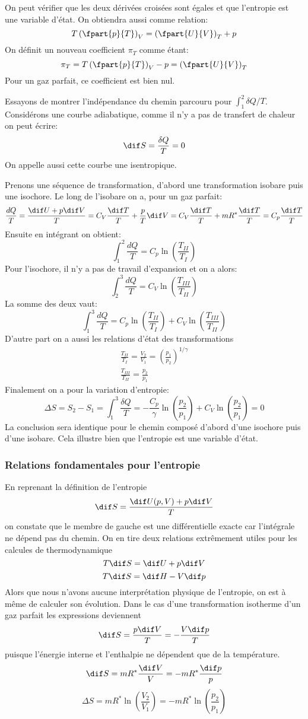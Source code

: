 On peut vérifier que les deux dérivées croisées sont égales et
que l'entropie est une variable d'état.
On obtiendra aussi comme relation:
\[ T\left(\fpart{p}{T}\right)_V =
\left(\fpart{U}{V}\right)_T+p \]
On définit un nouveau coefficient $\pi_T$ comme étant:
\[ \pi_T = T\left(\fpart{p}{T}\right)_V -p =
\left(\fpart{U}{V}\right)_T \]
Pour un gaz parfait, ce coefficient est bien nul.

Essayons de montrer l'indépendance du chemin parcouru
pour $\int_1^2 \delta Q/T$.
Considérons une courbe adiabatique,
comme il n'y a pas de transfert de chaleur on peut écrire:
\[ \dif S = \frac{\delta Q}{T} = 0 \]
On appelle aussi cette courbe une isentropique.

Prenons une séquence de transformation,
d'abord une transformation isobare puis une isochore.
Le long de l'isobare on a, pour un gaz parfait:
\[ \frac{dQ}{T} = \frac{\dif U+p\dif V}{T} =
C_V \frac{\dif T}{T}+\frac pT\dif V =
C_V \frac{\dif T}T+mR^*\frac{\dif T}T = C_p\frac{\dif T}T \]
Ensuite en intégrant on obtient:
\[ \int_1^2 \frac{dQ}T = C_p \ln \left (\frac{T_{II}}{T_{I}}\right) \]
Pour l'isochore, il n'y a pas de travail d'expansion et on a alors:
\[ \int_2^3 \frac{dQ}T = C_V \ln \left (\frac{T_{III}}{T_{II}}\right) \]
La somme des deux vaut:
\[ \int_1^3 \frac{dQ}T = C_p \ln \left (\frac{T_{II}}{T_{I}}\right)+
C_V \ln \left (\frac{T_{III}}{T_{II}}\right) \]
D'autre part on a aussi les relations d'état des transformations
\begin{align*}
  \frac{T_{II}}{T_I} = \frac{V_2}{V_1} =
  \left(\frac{p_1}{p_2}\right)^{1/\gamma}\\
  \frac{T_{III}}{T_{II}} = \frac {p_2}{p_1}
\end{align*}
Finalement on a pour la variation d'entropie:
\[ \Delta S = S_2-S_1 = \int_1^3 \frac{\delta Q}T =
-\frac{C_p}{\gamma} \ln \left(\frac{p_2}{p_1}\right) +
C_V \ln \left (\frac{p_2}{p_1}\right) = 0 \]
La conclusion sera identique pour le chemin composé d'abord
d'une isochore puis d'une isobare.
Cela illustre bien que l'entropie est une variable d'état.

\subsubsection{Relations fondamentales pour l'entropie}
En reprenant la définition de l'entropie
\[ \dif S = \frac{\dif U(p,V)+p\dif V}{T} \]
on constate que le membre de gauche est une différentielle exacte
car l'intégrale ne dépend pas du chemin.
On en tire deux relations extrêmement utiles
pour les calcules de thermodynamique
\[ T\dif S = \dif U+p\dif V \]
\[ T\dif S = \dif H-V\dif p \]
Alors que nous n'avons aucune interprétation physique de l'entropie,
on est à même de calculer son évolution.
Dans le cas d'une transformation isotherme
d'un gaz parfait les expressions deviennent
\[ \dif S = \frac{p\dif V}{T} = -\frac{V\dif p}{T} \]
puisque l'énergie interne et l'enthalpie ne dépendent que de la température.
\[ \dif S = mR^*\frac{\dif V}{V} = -mR^*\frac{\dif p}p \]
\[ \Delta S = mR^* \ln \left(\frac{V_2}{V_1}\right) =
-mR^* \ln \left(\frac{p_2}{p_1}\right) \]


